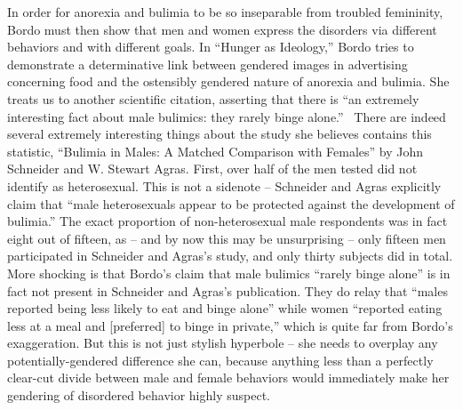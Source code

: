 \documentclass[11pt]{article}
\begin{document}
    In order for anorexia and bulimia to be so inseparable from troubled femininity, Bordo must then show that men and women express the disorders via different behaviors and with different goals. In ``Hunger as Ideology,'' Bordo tries to demonstrate a determinative link between gendered images in advertising concerning food and the ostensibly gendered nature of anorexia and bulimia. She treats us to another scientific citation, asserting that there is ``an extremely interesting fact about male bulimics: they rarely binge alone.''~\autocite[128]{Bordo03} There are indeed several extremely interesting things about the study she believes contains this statistic, ``Bulimia in Males: A Matched Comparison with Females'' by John Schneider and W. Stewart Agras. First, over half of the men tested did not identify as heterosexual. This is not a sidenote -- Schneider and Agras explicitly claim that ``male heterosexuals appear to be protected against the development of bulimia.'' The exact proportion of non-heterosexual male respondents was in fact eight out of fifteen, as -- and by now this may be unsurprising -- only fifteen men participated in Schneider and Agras's study, and only thirty subjects did in total. More shocking is that Bordo's claim that male bulimics ``rarely binge alone'' is in fact not present in Schneider and Agras's publication. They do relay that ``males reported being less likely to eat and binge alone'' while women ``reported eating less at a meal and [preferred] to binge in private,'' which is quite far from Bordo's exaggeration. But this is not just stylish hyperbole -- she needs to overplay any potentially-gendered difference she can, because anything less than a perfectly clear-cut divide between male and female behaviors would immediately make her gendering of disordered behavior highly suspect.
    
\end{document}
